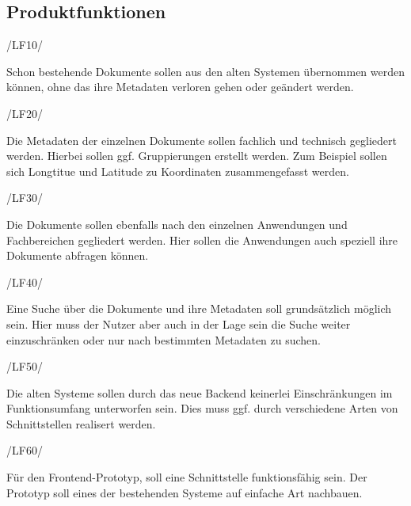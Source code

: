 \subsection{Produktfunktionen}
\begin{minipage}{3cm}
/LF10/
\end{minipage}
\begin{minipage}{13cm}
Schon bestehende Dokumente sollen aus den alten Systemen \"ubernommen werden k\"onnen, ohne das ihre Metadaten verloren gehen oder ge\"andert werden.\\
\end{minipage}
\begin{minipage}{3cm}
/LF20/
\end{minipage}
\begin{minipage}{13cm}
Die Metadaten der einzelnen Dokumente sollen fachlich und technisch gegliedert werden. Hierbei sollen ggf. Gruppierungen erstellt werden. Zum Beispiel sollen sich Longtitue und Latitude zu Koordinaten zusammengefasst werden.\\
\end{minipage}
\begin{minipage}{3cm}
/LF30/
\end{minipage}
\begin{minipage}{13cm}
Die Dokumente sollen ebenfalls nach den einzelnen Anwendungen und Fachbereichen gegliedert werden. Hier sollen die Anwendungen auch speziell ihre Dokumente abfragen k\"onnen.\\
\end{minipage}
\begin{minipage}{3cm}
/LF40/
\end{minipage}
\begin{minipage}{13cm}
Eine Suche \"uber die Dokumente und ihre Metadaten soll grunds\"atzlich m\"oglich sein. Hier muss der Nutzer aber auch in der Lage sein die Suche weiter einzuschr\"anken oder nur nach bestimmten Metadaten zu suchen.\\
\end{minipage}
\begin{minipage}{3cm}
/LF50/
\end{minipage}
\begin{minipage}{13cm}
Die alten Systeme sollen durch das neue Backend keinerlei Einschr\"ankungen im Funktionsumfang unterworfen sein. Dies muss ggf. durch verschiedene Arten von Schnittstellen realisert werden.\\
\end{minipage}
\begin{minipage}{3cm}
/LF60/
\end{minipage}
\begin{minipage}{13cm}
F\"ur den Frontend-Prototyp, soll eine Schnittstelle funktionsf\"ahig sein. Der Prototyp soll eines der bestehenden Systeme auf einfache Art nachbauen. \\
\end{minipage}

